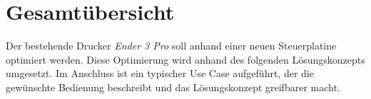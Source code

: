 \section{Gesamtübersicht}
\label{sec:Gesamtuebersicht}

Der bestehende Drucker \textit{Ender 3 Pro} soll anhand einer neuen Steuerplatine optimiert werden. Diese Optimierung wird anhand des folgenden Lösungskonzepts umgesetzt. Im Anschluss ist ein typischer Use Case aufgeführt, der die gewünschte Bedienung beschreibt und das Lösungskonzept greifbarer macht.

